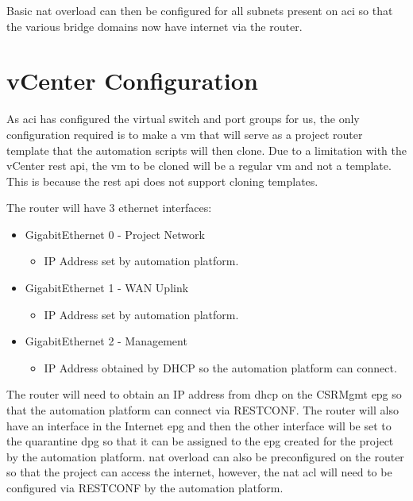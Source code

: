 Basic \gls{nat} overload can then be configured for all subnets present on \gls{aci} so that the various bridge domains now have internet via the router.

\section{vCenter Configuration}
As \gls{aci} has configured the virtual switch and port groups for us, the only configuration required is to make a \gls{vm} that will serve as a project router template that the automation scripts will then clone. Due to a limitation with the vCenter \gls{rest} \gls{api}, the \gls{vm} to be cloned will be a regular \gls{vm} and not a template. This is because the \gls{rest} \gls{api} does not support cloning templates.

The router will have 3 ethernet interfaces:
\begin{itemize}
    \item GigabitEthernet 0 - Project Network
          \begin{itemize}
              \item IP Address set by automation platform.
          \end{itemize}
    \item GigabitEthernet 1 - WAN Uplink
          \begin{itemize}
              \item IP Address set by automation platform.
          \end{itemize}
    \item GigabitEthernet 2 - Management
          \begin{itemize}
              \item IP Address obtained by DHCP so the automation platform can connect.
          \end{itemize}
\end{itemize}


The router will need to obtain an IP address from \gls{dhcp} on the CSRMgmt \gls{epg} so that the automation platform can connect via RESTCONF. The router will also have an interface in the Internet \gls{epg} and then the other interface will be set to the quarantine \gls{dpg} so that it can be assigned to the \gls{epg} created for the project by the automation platform. \gls{nat} overload can also be preconfigured on the router so that the project can access the internet, however, the \gls{nat} \gls{acl} will need to be configured via RESTCONF by the automation platform.

